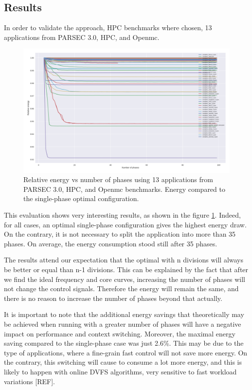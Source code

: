 \subsection{Results}


In order to validate the approach, HPC benchmarks where chosen, 13 applications from PARSEC 3.0, HPC, and Openmc.

\begin{figure}[h]
\includegraphics[width=\columnwidth]{fingerprint/figures/energy_per_phase.png}
    \caption{Relative energy vs number of phases using 13 applications from PARSEC 3.0, HPC, and Openmc benchmarks. Energy compared to the single-phase optimal configuration.}
    \label{fig:relative_energy}
\end{figure}

This evaluation shows very interesting results, as shown in the figure \ref{fig:relative_energy}. Indeed, for all cases, an optimal single-phase configuration gives the highest energy draw. On the contrary, it is not necessary to split the application into more than 35 phases. On average, the energy consumption stood still after 35 phases. 

The results attend our expectation that the optimal with n divisions will always be better or equal than n-1 divisions. This can be explained by the fact that after we find the ideal frequency and core curves, increasing the number of phases will not change the control signals. Therefore the energy will remain the same, and there is no reason to increase the number of phases beyond that actually. 

It is important to note that the additional energy savings that theoretically may be achieved when running with a greater number of phases will have a negative impact on performance and context switching. Moreover, the maximal energy saving compared to the single-phase case was just 2.6\%. This may be due to the type of applications, where a fine-grain fast control will not save more energy. On the contrary, this switching will cause to consume a lot more energy, and this is likely to happen with online DVFS algorithms, very sensitive to fast workload variations [REF].

